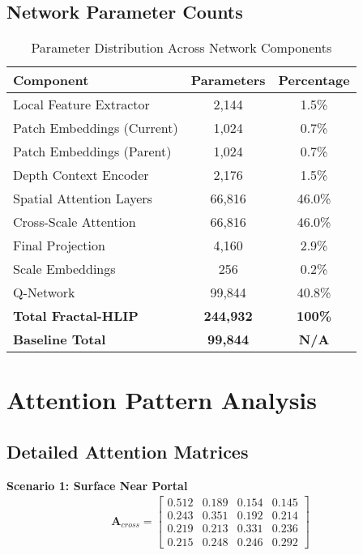 \documentclass[11pt]{article}
\begin{document}
\subsection{Network Parameter Counts}

\begin{table}[h]
\centering
\caption{Parameter Distribution Across Network Components}
\begin{tabular}{lcc}
\toprule
Component & Parameters & Percentage \\
\midrule
Local Feature Extractor & 2,144 & 1.5\% \\
Patch Embeddings (Current) & 1,024 & 0.7\% \\
Patch Embeddings (Parent) & 1,024 & 0.7\% \\
Depth Context Encoder & 2,176 & 1.5\% \\
Spatial Attention Layers & 66,816 & 46.0\% \\
Cross-Scale Attention & 66,816 & 46.0\% \\
Final Projection & 4,160 & 2.9\% \\
Scale Embeddings & 256 & 0.2\% \\
Q-Network & 99,844 & 40.8\% \\
\midrule
\textbf{Total Fractal-HLIP} & \textbf{244,932} & \textbf{100\%} \\
\textbf{Baseline Total} & \textbf{99,844} & \textbf{N/A} \\
\bottomrule
\end{tabular}
\end{table}

\section{Attention Pattern Analysis}

\subsection{Detailed Attention Matrices}

\textbf{Scenario 1: Surface Near Portal}
\begin{align}
\mathbf{A}_{cross} = \begin{bmatrix}
0.512 & 0.189 & 0.154 & 0.145 \\
0.243 & 0.351 & 0.192 & 0.214 \\
0.219 & 0.213 & 0.331 & 0.236 \\
0.215 & 0.248 & 0.246 & 0.292
\end{bmatrix}
\end{align}
\end{document}
